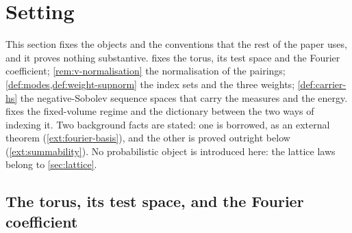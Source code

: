 %
\section{Setting}\label{sec:setting}

This section fixes the objects and the conventions that the rest of the paper
uses, and it proves nothing substantive.  fixes the torus, its
test space and the Fourier coefficient; \cref{rem:v-normalisation} the
normalisation of the pairings; \cref{def:modes,def:weight-supnorm} the index
sets and the three weights; \cref{def:carrier-hs} the negative-Sobolev sequence
spaces that carry the measures and the energy.  fixes the
fixed-volume regime and the dictionary between the two ways of indexing it. Two
background facts are stated: one is borrowed, as an external
theorem (\cref{ext:fourier-basis}), and the other is proved outright below
(\cref{ext:summability}). No probabilistic object is
introduced here: the lattice laws belong to \cref{sec:lattice}.

\subsection{The torus, its test space, and the Fourier coefficient}


